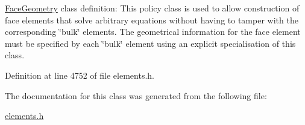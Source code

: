 \hyperlink{classoomph_1_1FaceGeometry}{Face\+Geometry} class definition\+: This policy class is used to allow construction of face elements that solve arbitrary equations without having to tamper with the corresponding \char`\"{}bulk\char`\"{} elements. The geometrical information for the face element must be specified by each \char`\"{}bulk\char`\"{} element using an explicit specialisation of this class. 

Definition at line 4752 of file elements.\+h.



The documentation for this class was generated from the following file\+:\begin{DoxyCompactItemize}
\item 
\hyperlink{elements_8h}{elements.\+h}\end{DoxyCompactItemize}
